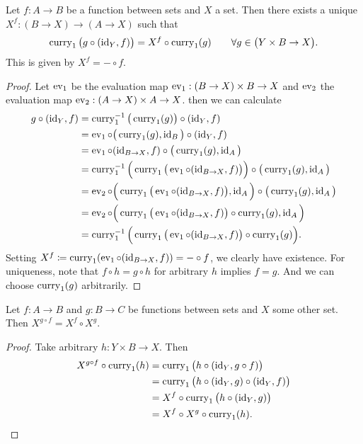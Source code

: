\begin{proposition}
Let $f: A\to B$ be a function between sets and $X$ a set. Then there exists a unique $X^f: (B\to X) \to (A\to X)$ such that
\[ \operatorname{curry}_1\big(g\circ (\operatorname{id}_Y, f)\big) = X^f\circ \operatorname{curry}_1(g) \qquad \forall g\in \big(Y\times B \to X\big). \]
This is given by $X^f = -\circ f$.
\end{proposition}
\begin{proof}
Let $\operatorname{ev}_1$ be the evaluation map $\operatorname{ev}_1: (B\to X)\times B \to X$ and $\operatorname{ev}_2$ the evaluation map $\operatorname{ev}_2: (A\to X) \times A \to X$.
then we can calculate
\begin{align*}
g\circ (\operatorname{id}_Y, f) &= \operatorname{curry}_1^{-1}\big(\operatorname{curry}_1(g)\big)\circ (\operatorname{id}_Y, f) \\
&= \operatorname{ev}_1 \circ \big(\operatorname{curry}_1(g), \operatorname{id}_B\big)\circ (\operatorname{id}_Y, f) \\
&= \operatorname{ev}_1 \circ (\operatorname{id}_{B\to X}, f) \circ \big(\operatorname{curry}_1(g), \operatorname{id}_A\big) \\
&= \operatorname{curry}_1^{-1}\Big(\operatorname{curry}_1\big(\operatorname{ev}_1 \circ (\operatorname{id}_{B\to X}, f)\big)\Big) \circ \big(\operatorname{curry}_1(g), \operatorname{id}_A\big) \\
&= \operatorname{ev}_2\circ\Big(\operatorname{curry}_1\big(\operatorname{ev}_1 \circ (\operatorname{id}_{B\to X}, f)\big), \operatorname{id}_A\Big) \circ \big(\operatorname{curry}_1(g), \operatorname{id}_A\big) \\
&= \operatorname{ev}_2\circ\Big(\operatorname{curry}_1\big(\operatorname{ev}_1 \circ (\operatorname{id}_{B\to X}, f)\big)\circ \operatorname{curry}_1(g), \operatorname{id}_A\Big) \\
&= \operatorname{curry}_1^{-1}\Big(\operatorname{curry}_1\big(\operatorname{ev}_1 \circ (\operatorname{id}_{B\to X}, f)\big)\circ \operatorname{curry}_1(g) \Big).
\end{align*}
Setting $X^f \coloneqq \operatorname{curry}_1(\operatorname{ev}_1\circ (\operatorname{id}_{B\to X}, f)) = -\circ f$, we clearly have existence. For uniqueness, note that $f\circ h = g \circ h$ for arbitrary $h$ implies $f=g$. And we can choose $\operatorname{curry}_1(g)$ arbitrarily.
\end{proof}
\begin{corollary}
Let $f: A\to B$ and $g: B\to C$ be functions between sets and $X$ some other set. Then $X^{g\circ f} = X^f\circ X^g$.
\end{corollary}
\begin{proof}
Take arbitrary $h: Y\times B \to X$. Then
\begin{align*}
X^{g\circ f}\circ \operatorname{curry}_1(h) &= \operatorname{curry}_1\big(h \circ (\operatorname{id}_Y, g\circ f)\big) \\
&= \operatorname{curry}_1\big(h \circ (\operatorname{id}_Y, g)\circ (\operatorname{id}_Y, f)\big) \\
&= X^f\circ \operatorname{curry}_1\big(h \circ (\operatorname{id}_Y, g)\big) \\
&= X^f\circ X^g \circ \operatorname{curry}_1(h).
\end{align*}
\end{proof}

